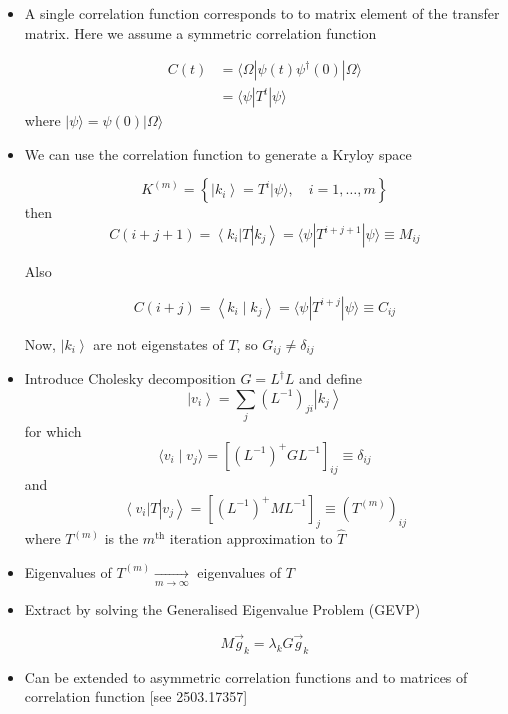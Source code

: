 \begin{itemize}
  \item A single correlation function corresponds to to matrix element of the transfer matrix. Here we assume a symmetric correlation function

\begin{equation}
\begin{aligned}
C(t) & =\langle \Omega| \psi(t) \psi^{\dagger}(0)|\Omega\rangle \\
& =\langle\psi| T^{t}|\psi\rangle
\end{aligned}
\end{equation}
where $|\psi\rangle=\psi(0)|\Omega\rangle$
  \item We can use the correlation function to generate a Kryloy space


\begin{equation}
K^{(m)}=\left\{\left|k_{i}\right\rangle=T^{i}|\psi\rangle, \quad i=1, \ldots, m\right\}
 \end{equation}
then
\begin{equation}
C(i+j+1)=\left\langle k_{i}\right| T\left|k_{j}\right\rangle=\langle\psi|T^{i+j+1}|\psi\rangle \equiv M_{i j}
 \end{equation}

Also

\begin{equation}
C(i+j)=\left\langle k_{i} \mid k_{j}\right\rangle=\langle\psi| T^{i+j}|\psi\rangle \equiv C_{i j}
\end{equation}

Now, \(\left|k_{i}\right\rangle\) are not eigenstates of \(T\), so \(G_{i j} \neq \delta_{i j}\)

  \item Introduce Cholesky decomposition \(G=L^{\dagger} L\) and define
\begin{equation}
\left| v_{i}\right\rangle=\sum_j(L^{-1})_{ji} \left|k_j\right\rangle
\end{equation}
for which
\begin{equation}
\langle v_{i}\mid v_{j}\rangle=\left[\left(L^{-1}\right)^{+} G L^{-1}\right]_{ij} \equiv\delta_{ij}
\end{equation}
and
\begin{equation}
\left\langle v_{i}\right| T\left|v_{j}\right\rangle=\left[\left(L^{-1}\right)^{+} M L^{-1}\right]_{j} \equiv\left(T^{(m)}\right)_{ij}
\end{equation}
where $T^{(m)}$ is the $m^{\text{th}}$ iteration approximation to $\hat T$

  \item Eigenvalues of \(T^{(m)} \underset{m \rightarrow \infty}{\rightarrow}\) eigenvalues of \(T\)
  \item Extract by solving the Generalised Eigenvalue Problem (GEVP)

\begin{equation}
M \vec{g}_{k}=\lambda_{k} G \vec{g}_{k}
\end{equation}

  \item Can be extended to asymmetric correlation functions and to matrices of correlation function [see 2503.17357]
\end{itemize}


